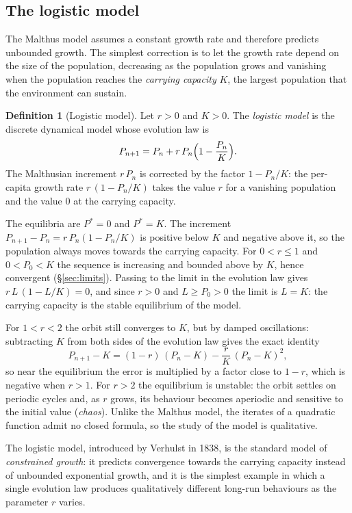 \documentclass[11pt,a4paper]{article}
\theoremstyle{definition} \newtheorem{definition}{Definition} \theoremstyle{plain} \newtheorem{theorem}{Theorem}
\begin{document}
\subsection{The logistic model}

The Malthus model assumes a constant growth rate and therefore predicts
unbounded growth. The simplest correction is to let the growth rate
depend on the size of the population, decreasing as the population grows
and vanishing when the population reaches the \emph{carrying capacity}
$K$, the largest population that the environment can sustain.

\begin{definition}[Logistic model] Let $r>0$ and $K>0$. The \emph{logistic
model} is the discrete dynamical model whose evolution law is
\[ P_{n+1} = P_n + r\,P_n\Bigl(1-\frac{P_n}{K}\Bigr). \]
The Malthusian increment $r\,P_n$ is corrected by the factor $1-P_n/K$:
the per-capita growth rate $r\,(1-P_n/K)$ takes the value $r$ for a
vanishing population and the value $0$ at the carrying capacity.
\end{definition}

The equilibria are $P^*=0$ and $P^*=K$. The increment
$P_{n+1}-P_n = r\,P_n(1-P_n/K)$ is positive below $K$ and negative above
it, so the population always moves towards the carrying capacity. For
$0<r\le 1$ and $0<P_0<K$ the sequence is increasing and bounded above by
$K$, hence convergent (\S\ref{sec:limits}). Passing to the limit in the evolution law
gives $r\,L\,(1-L/K)=0$, and since $r>0$ and $L\ge P_0>0$ the limit is
$L=K$: the carrying capacity is the stable equilibrium of the model.

For $1<r<2$ the orbit still converges to $K$, but by damped
oscillations: subtracting $K$ from both sides of the evolution law gives
the exact identity
\[ P_{n+1}-K = (1-r)\,(P_n-K) - \frac{r}{K}\,(P_n-K)^2, \]
so near the equilibrium the error is multiplied by a factor close to
$1-r$, which is negative when $r>1$. For $r>2$ the equilibrium is
unstable: the orbit settles on periodic cycles and, as $r$ grows, its
behaviour becomes aperiodic and sensitive to the initial value
(\emph{chaos}). Unlike the Malthus model, the iterates of a quadratic
function admit no closed formula, so the study of the model is
qualitative.

The logistic model, introduced by Verhulst in 1838, is the standard
model of \emph{constrained growth}: it predicts convergence towards the
carrying capacity instead of unbounded exponential growth, and it is the
simplest example in which a single evolution law produces qualitatively
different long-run behaviours as the parameter $r$ varies.
\end{document}

